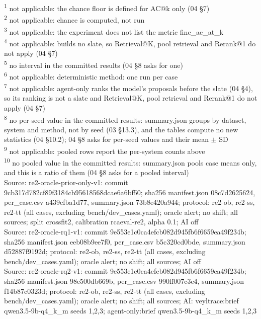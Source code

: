 \begin{table}[t]
\begin{tabular}{lllllllllllllllllllll}
\hline
\end{tabular}
\par\smallskip\footnotesize
\textsuperscript{1} not applicable: the chance floor is defined for AC@k only (04 \S{}7)\\
\textsuperscript{2} not applicable: chance is computed, not run\\
\textsuperscript{3} not applicable: the experiment does not list the metric fine\_ac\_at\_k\\
\textsuperscript{4} not applicable: builds no slate, so Retrieval@K, pool retrieval and Rerank@1 do not apply (04 \S{}7)\\
\textsuperscript{5} no interval in the committed results (04 \S{}8 asks for one)\\
\textsuperscript{6} not applicable: deterministic method: one run per case\\
\textsuperscript{7} not applicable: agent-only ranks the model's proposals before the slate (04 \S{}4), so its ranking is not a slate and Retrieval@K, pool retrieval and Rerank@1 do not apply (04 \S{}7)\\
\textsuperscript{8} no per-seed value in the committed results: summary.json groups by dataset, system and method, not by seed (03 \S{}13.3), and the tables compute no new statistics (04 \S{}10.2); 04 \S{}8 asks for per-seed values and their mean $\pm$ SD\\
\textsuperscript{9} not applicable: pooled rows report the per-system counts above\\
\textsuperscript{10} no pooled value in the committed results: summary.json pools case means only, and this is a ratio of them (04 \S{}8 asks for a pooled interval)\\
Source: re2-oracle-prior-only-v1: commit 9cb317d782cf89f3184cb95618568dcae6a6bf50; sha256 manifest.json 08c7d2625624, per\_case.csv a439cfba1d77, summary.json 73b8e420a944; protocol: re2-ob, re2-ss, re2-tt (all cases, excluding bench/dev\_cases.yaml); oracle alert; no shift; all sources; split crossfit2, calibration rcaeval-re2, alpha 0.1; AI off\\
Source: re2-oracle-rq1-v1: commit 9e553e1c0ca4efcb082d945fb6f6659ea49f234b; sha256 manifest.json eeb08b9ee7f0, per\_case.csv b5c320cd0bde, summary.json d52887f9192d; protocol: re2-ob, re2-ss, re2-tt (all cases, excluding bench/dev\_cases.yaml); oracle alert; no shift; all sources; AI off\\
Source: re2-oracle-rq2-v1: commit 9e553e1c0ca4efcb082d945fb6f6659ea49f234b; sha256 manifest.json 98e500db669b, per\_case.csv 990ff007c3e4, summary.json f14b87c0323d; protocol: re2-ob, re2-ss, re2-tt (all cases, excluding bench/dev\_cases.yaml); oracle alert; no shift; all sources; AI: veyltrace:brief qwen3.5-9b-q4\_k\_m seeds 1,2,3; agent-only:brief qwen3.5-9b-q4\_k\_m seeds 1,2,3\\
\end{table}

